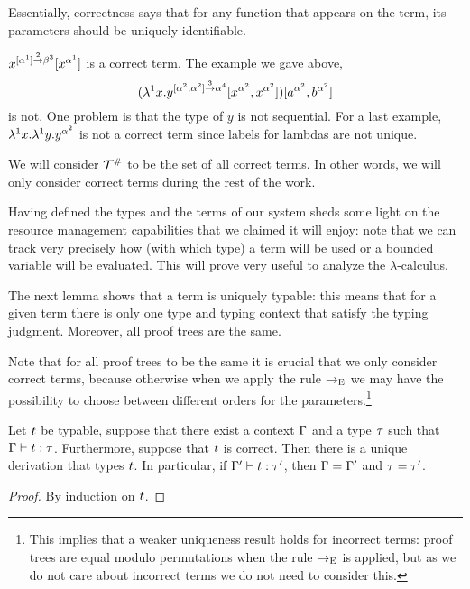 Essentially, correctness says that for
any function that appears on the term, its parameters should be uniquely identifiable.

\begin{example}
$x^{[\alpha^1] \overset{2}{\to} \beta^3}[x^{\alpha^1}]$ is a correct term.
The example we gave above,
\[(\lambda^{1} x. y^{[\alpha^2, \alpha^2] \overset{3}{\to} \alpha^4} [x^{\alpha^2}, x^{\alpha^2}])
[a^{\alpha^2}, b^{\alpha^2}]\]
is not.
One problem is that the type of $y$ is not sequential.
For a last example,
$\lambda^{1} x. \lambda^{1} y. y^{\alpha^2}$
is not a correct term since labels for lambdas are not unique.
\end{example}

\begin{remark}
We will consider $\mathcal{T}^{\mathtt{\#}}$ to be the set of all correct terms.
In other words, we will only consider correct terms during the rest of the work.
\end{remark}


Having defined the types and the terms of our system
sheds some light on the resource management capabilities that we claimed it will enjoy:
note that we can track very precisely how (\ie with which type) a term will be used or
a bounded variable will be evaluated.
This will prove very useful to analyze the $\lambda$-calculus.

The next lemma shows that a term is uniquely typable: this means that for a given term
there is only one type and typing context that satisfy the typing judgment.
Moreover, all proof trees are the same.

Note that for all proof trees to be the same it is crucial that
we only consider correct terms, because otherwise when we apply the rule
$\to_{\mathrm{E}}$ we may have the possibility to choose between different orders for the
parameters.\footnote{This implies that a weaker uniqueness result holds for
incorrect terms: proof trees are equal modulo permutations when the rule $\to_{\mathrm{E}}$
is applied, but as we do not care about incorrect terms we do not need to consider this.}

\begin{lemma}
Let $t$ be typable, \ie suppose that there exist a context $\Gamma$ and a type $\tau$ such that $\Gamma \vdash t : \tau$. Furthermore, suppose that $t$ is correct.
Then there is a unique derivation that types $t$.
In particular, if $\Gamma' \vdash t : \tau'$, then $\Gamma = \Gamma'$ and $\tau = \tau'$.
\end{lemma}
\begin{proof}
By induction on $t$.
\end{proof}

